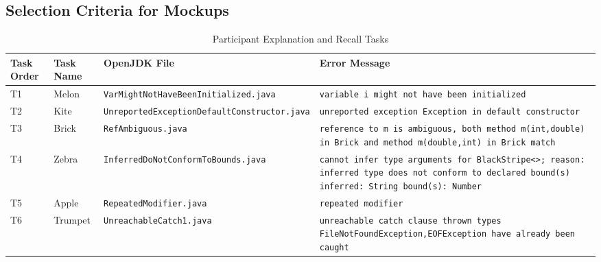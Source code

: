 \documentclass[conference]{IEEEtran}
\begin{document}

\subsection{Selection Criteria for Mockups}

\begin{table}[!t]
\caption{Participant Explanation and Recall Tasks\label{tab:tasks}}
\centering
\begin{tabularx}{\textwidth}{lllX}
\toprule
Task Order & Task Name & OpenJDK File & Error Message\\
\midrule

T1 & Melon & \texttt{VarMightNotHaveBeenInitialized.java} & \texttt{variable i might not have been initialized} \\
[0.2cm]
\midrule

T2 & Kite & \texttt{UnreportedExceptionDefaultConstructor.java} & \texttt{unreported exception Exception in default constructor} \\
[0.2cm]
\midrule

T3 & Brick & \texttt{RefAmbiguous.java} & \texttt{reference to m is ambiguous, both method m(int,double) in Brick and method m(double,int) in Brick match}\\
[0.2cm]
\midrule

T4 & Zebra & \texttt{InferredDoNotConformToBounds.java} & \texttt{cannot infer type arguments for BlackStripe<>;\newline
reason: inferred type does not conform to declared bound(s)\newline\newline
inferred: String\newline
    bound(s): Number}\\
[0.2cm]
\midrule

T5 & Apple & \texttt{RepeatedModifier.java} & \texttt{repeated modifier
}\\
[0.2cm]
\midrule

T6 & Trumpet & \texttt{UnreachableCatch1.java} & \texttt{unreachable catch clause\newline     
  thrown types FileNotFoundException,EOFException have already been caught
}\\
[0.2cm]

\bottomrule
\end{tabularx}
\end{table}
\end{document}
